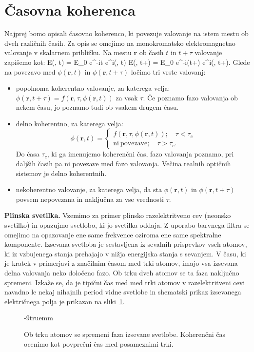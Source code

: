 \section{Časovna koherenca}
Najprej bomo opisali časovno koherenco, ki povezuje valovanje na istem mestu 
ob dveh različnih časih. Za opis se omejimo na monokromatsko elektromagnetno 
valovanje v skalarnem približku. Na mestu $\mathbf{r}$ ob časih $t$ in $t+\tau$ valovanje
zapišemo kot:
\beq
E(, t) = E_0 e^{-i\omega t} e^{i\phi(, t)}
\qquad {} \qquad
E(, t+\tau) = E_0 e^{-i\omega (t+\tau)} e^{i\phi(, t+\tau)}.
\label{eq:08_03}
\eeq
Glede na povezavo med $\phi(\mathbf{r}, t)$ in $\phi(\mathbf{r}, t+\tau)$ 
ločimo tri vrste valovanj:
\begin{itemize}
 \item popolnoma koherentno valovanje, za katerega velja: $\phi(\mathbf{r}, t+\tau) = 
 f(\mathbf{r}, \tau, \phi(\mathbf{r}, t))$ za vsak $\tau$. 
 Če poznamo fazo valovanja ob nekem času, jo poznamo tudi ob vsakem drugem času.
 \item delno koherentno, za katerega velja:
\begin{equation}
\phi(\mathbf{r}, t)=\begin{cases}
f(\mathbf{r}, \tau, \phi(\mathbf{r}, t)); \quad \tau < \tau_c\\
\mathrm{ni~povezave}; \quad \tau > \tau_c.
\end{cases}
\label{eq:08_04}
\end{equation}
Do časa $\tau_c$, ki ga imenujemo koherenčni čas, fazo valovanja 
poznamo, pri daljših časih pa ni povezave med fazo valovanja. Večina
realnih optičnih sistemov je delno koherentnih.
 \item nekoherentno valovanje, za katerega velja, da
 sta $\phi(\mathbf{r}, t)$ in $\phi(\mathbf{r}, t+\tau)$
 povsem nepovezana in naključna za vse vrednosti $\tau$.
\end{itemize}
\begin{example}{\bf Plinska svetilka.}
Vzemimo za primer plinsko razelektritveno cev (neonsko svetilko) in 
opazujmo svetlobo, ki jo svetilka oddaja. Z uporabo barvnega 
filtra se omejimo na opazovanje ene same frekvence oziroma 
ene same spektralne komponente. Izsevana svetloba je sestavljena iz
sevalnih prispevkov vseh atomov, ki iz vzbujenega stanja prehajajo v 
nižja energijska stanja s sevanjem. V času, ki je kratek v primerjavi 
z značilnim časom med trki atomov, imajo vsa izsevana delna valovanja 
neko določeno fazo. Ob trku dveh atomov se ta faza naključno spremeni. 
Izkaže se, da je tipični čas med med trki atomov v razelektritveni cevi 
navadno le nekaj nihajnih period vidne svetlobe in shematski prikaz
izsevanega električnega polja je prikazan na sliki~\ref{fig:08_neon}.
\begin{figure}[h!]
\centering
\def\svgwidth{80truemm} 

\caption{Ob trku atomov se spremeni faza izsevane svetlobe. Koherenčni
čas ocenimo kot povprečni čas med posameznimi trki.
}
\label{fig:08_neon}
\vglue-9truemm
\end{figure}

\end{example}


